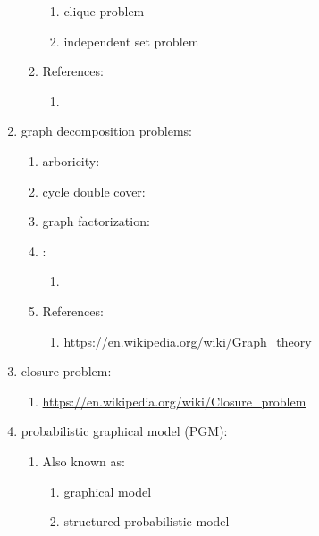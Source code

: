 \begin{enumerate}
\begin{enumerate}
		\begin{enumerate} \itemsep -2pt
		\item clique problem
		\item independent set problem
		\end{enumerate}
	\item References: \vspace{-0.2cm}
		\begin{enumerate} \itemsep -2pt
		\item 
		\end{enumerate}
	\end{enumerate}
\item graph decomposition problems: \vspace{-0.3cm}
	\begin{enumerate} \itemsep -2pt
	\item arboricity: \url{}
	\item cycle double cover: \url{}
	\item graph factorization: \url{}
	\item : \vspace{-0.2cm}
		\begin{enumerate} \itemsep -2pt
		\item 
		\end{enumerate}
	\item References: \vspace{-0.2cm}
		\begin{enumerate} \itemsep -2pt
		\item \url{https://en.wikipedia.org/wiki/Graph_theory}
		\end{enumerate}
	\end{enumerate}
\item closure problem: \vspace{-0.3cm}
	\begin{enumerate} \itemsep -2pt
	\item \url{https://en.wikipedia.org/wiki/Closure_problem}
	\end{enumerate}
\item probabilistic graphical model (PGM): \vspace{-0.3cm}
	\begin{enumerate} \itemsep -2pt
	\item Also known as: \vspace{-0.2cm}
		\begin{enumerate} \itemsep -2pt
		\item graphical model
		\item structured probabilistic model

\end{enumerate}
\end{enumerate}
\end{enumerate}
